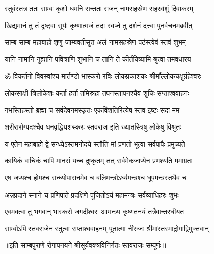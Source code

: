 


\twolineshloka
{स्तुवंस्तत्र ततः साम्बः कृशो धमनि सन्ततः}
{राजन् नामसहस्रेण सहस्रांशुं दिवाकरम्} %

\twolineshloka
{खिद्यमानं तु तं दृष्ट्वा सूर्यः कृष्णात्मजं तदा}
{स्वप्ने तु दर्शनं दत्त्वा पुनर्वचनमब्रवीत्} %


\twolineshloka
{साम्ब साम्ब महाबाहो शृणु जाम्बवतीसुत}
{अलं नामसहस्रेण पठंस्त्वेवं स्तवं शुभम्} %

\twolineshloka
{यानि नामानि गुह्यानि पवित्राणि शुभानि च}
{तानि ते कीर्तयिष्यामि श्रुत्वा तमवधारय} %

\twolineshloka
{ॐ विकर्तनो विवस्वांश्च मार्तण्डो भास्करो रविः}
{लोकप्रकाशकः श्रीमाँल्लोकचक्षुर्ग्रहेश्वरः} %

\twolineshloka
{लोकसाक्षी त्रिलोकेशः कर्ता हर्ता तमिस्रहा}
{तपनस्तापनश्चैव शुचिः सप्ताश्ववाहनः} %

\twolineshloka
{गभस्तिहस्तो ब्रह्मा च सर्वदेवनमस्कृतः}
{एकविंशतिरित्येष स्तव इष्टः सदा मम} %

\twolineshloka
{शरीरारोग्यदश्चैव धनवृद्धियशस्करः}
{स्तवराज इति ख्यातस्त्रिषु लोकेषु विश्रुतः} %

\twolineshloka
{य एतेन महाबाहो द्वे सन्ध्येऽस्तमनोदये}
{स्तौति मां प्रणतो भूत्वा सर्वपापैः प्रमुच्यते} %

\twolineshloka
{कायिकं वाचिकं चापि मानसं यच्च दुष्कृतम्}
{तत् सर्वमेकजाप्येन प्रणश्यति ममाग्रतः} %

\twolineshloka
{एष जप्यश्च होमश्च सन्ध्योपासनमेव च}
{बलिमन्त्रोऽर्घ्यमन्त्रश्च धूपमन्त्रस्तथैव च} %

\twolineshloka
{अन्नप्रदाने स्नाने च प्रणिपाते प्रदक्षिणे}
{पूजितोऽयं महामन्त्रः सर्वव्याधिहरः शुभः} %

\twolineshloka
{एवमक्त्वा तु भगवान् भास्करो जगदीश्वरः}
{आमन्त्र्य कृष्णतनयं तत्रैवान्तरधीयत} %

\twolineshloka
{साम्बोऽपि स्तवराजेन स्तुत्वा सप्ताश्ववाहनम्}
{पूतात्मा नीरुजः श्रीमांस्तस्माद्रोगाद्विमुक्तवान्} %


॥इति साम्बपुराणे रोगापनयने श्रीसूर्यवक्त्रविनिर्गतः स्तवराजः सम्पूर्णः॥